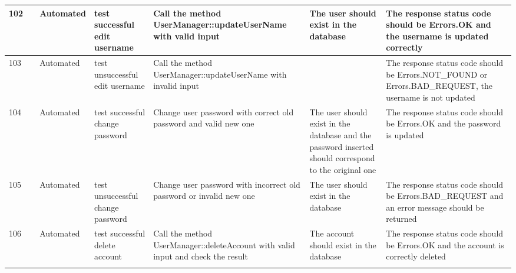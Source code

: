 \documentclass{article}
\begin{document}
{\begin{tabular}{|
      >{\columncolor[HTML]{FFFFFF}}l |
      >{\columncolor[HTML]{FFFFFF}}c |
      >{\columncolor[HTML]{FFFFFF}}l |l|l|l|l|}
    102                       & \cellcolor[HTML]{FFFFFF}                                       & {\color[HTML]{11734B} Automated} & test successful edit username       & Call the method UserManager::updateUserName with valid input                        & The user should exist in the database                                                                 & The response status code should be Errors.OK and the username is updated correctly                                    \\ \cline{1-1} \cline{3-7}
    103                       & \cellcolor[HTML]{FFFFFF}                                       & {\color[HTML]{11734B} Automated} & test unsuccessful edit username     & Call the method UserManager::updateUserName with invalid input                      &                                                                                                       & The response status code should be Errors.NOT\_FOUND or Errors.BAD\_REQUEST, the username is not updated              \\ \cline{1-1} \cline{3-7}
    104                       & \cellcolor[HTML]{FFFFFF}                                       & {\color[HTML]{11734B} Automated} & test successful change password     & Change user password with correct old password and valid new one                    & The user should exist in the database and the password inserted should correspond to the original one & The response status code should be Errors.OK and the password is updated                                              \\ \cline{1-1} \cline{3-7}
    105                       & \cellcolor[HTML]{FFFFFF}                                       & {\color[HTML]{11734B} Automated} & test unsuccessful change password   & Change user password with incorrect old password or invalid new one                 & The user should exist in the database                                                                 & The response status code should be Errors.BAD\_REQUEST and an error message should be returned                        \\ \cline{1-1} \cline{3-7}
    106                       & \cellcolor[HTML]{FFFFFF}                                       & {\color[HTML]{11734B} Automated} & test successful delete account      & Call the method UserManager::deleteAccount with valid input and check the result    & The account should exist in the database                                                              & The response status code should be Errors.OK and the account is correctly deleted                                     \\ \cline{1-1} \cline{3-7}

\end{tabular}}
\end{document}
